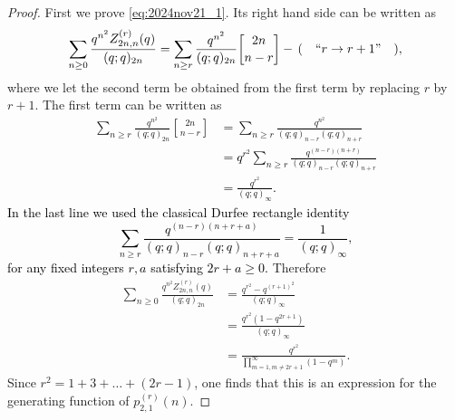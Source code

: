\documentclass[10pt,a4paper]{amsart}
\newcommand{\red}[1]{\textcolor{black}{#1}}
\begin{document}
\begin{proof}
First we prove \eqref{eq:2024nov21_1}.
Its right hand side can be written as
\begin{equation*}
\sum_{n \geq 0} \frac{q^{n^2} Z_{2n,n}^{(r)}(q)}{(q;q)_{2n}} =
\sum_{n \geq r} \frac{q^{n^2} }{(q;q)_{2n}} { 2n \brack n-r } \\
- \, ( \quad ``r \rightarrow r + 1" \quad ),
\end{equation*}
where we let the second term be obtained from the first term
by replacing $r$ by $r +1$.
The first term can be written as
\red{
\begin{align}
\sum_{n \geq r} \frac{q^{n^2} }{(q;q)_{2n}} { 2n \brack n-r }  &=
\sum_{n \geq r} \frac{q^{n^2} }{(q;q)_{n-r} (q;q)_{n+r}} \nonumber\\
&=
q^{r^2}\sum_{n \geq r} \frac{q^{(n-r)(n+r)} }{(q;q)_{n-r} (q;q)_{n+r}} \nonumber\\
&= 
\frac{q^{r^2}}{(q;q)_{\infty}}.\label{eq:2025june23_1}
\end{align}
In the last line we used the classical Durfee rectangle identity
\begin{equation}\label{eq:2024july11_3}
\sum_{n \geq r} \frac{q^{(n-r)(n+r+a)} }{(q;q)_{n-r} (q;q)_{n+r+a}} = \frac{1}{(q;q)_{\infty}},
\end{equation}
for any fixed integers $r, a$ satisfying $2r+a \geq 0$.}
Therefore
\begin{align*}
\sum_{n \geq 0} \frac{q^{n^2} Z_{2n,n}^{(r)}(q)}{(q;q)_{2n}} &=
\frac{q^{r^2} - q^{(r+1)^2}}{(q;q)_{\infty}} \\
&= 
\frac{q^{r^2}(1 - q^{2r+1})}{(q;q)_{\infty}} \\
&= \frac{q^{r^2}}{\prod_{m=1, m \ne 2r+1}^\infty (1-q^m)}.
\end{align*}
Since $r^2 = 1 + 3 + \dots + (2 r-1)$, one finds that
this is an expression for the generating function of $p^{(r)}_{2,1}(n)$.



\end{proof}
\end{document}
